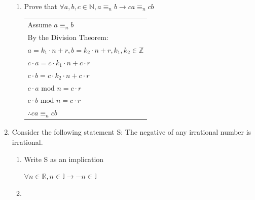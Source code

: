 \documentclass{article}
\begin{document}
\begin{enumerate}
\begin{enumerate}
\item Prove that $\forall a, b, c \in \mathbb N, a \equiv_n b \rightarrow ca \equiv_n cb$


\begin{tabular}{l}
Assume $a \equiv_n b$\\
By the Division Theorem:\\
$a = k_1 \cdot n + r, b = k_2 \cdot n + r, k_1, k_2 \in \mathbb Z$\\
$c \cdot a = c \cdot k_1 \cdot n + c \cdot r$\\
$c \cdot b = c \cdot k_2 \cdot n + c \cdot r$\\
$c \cdot a \text{ mod } n = c \cdot r$\\
$c \cdot b \text{ mod } n = c \cdot r$\\
$\therefore ca \equiv_n cb$
\end{tabular}

\end{enumerate}

\item Consider the following statement S: The negative of any irrational number is irrational.

\begin{enumerate}
  \item Write S as an implication

$\forall n \in \mathbb R, n \in \mathbb I \rightarrow -n \in \mathbb I$

  \item


\end{enumerate}

\end{enumerate}
\end{document}
